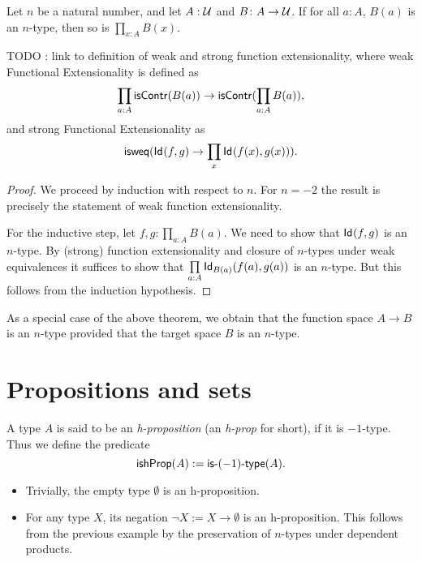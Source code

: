 \begin{thm}\label{thm:hlevel-prod}
 Let $n$ be a natural number, and let $A : \type$ and $B \colon A \to \type$.
     If for all $a : A$, $B(a)$ is an $n$-type, then so is $\prod\limits_{x : A} B(x)$.
\end{thm}

TODO : link to definition of weak and strong function extensionality, where
weak Functional Extensionality is defined as
\[ \prod_{a : A} \iscontr (B(a)) \to \iscontr (\prod_{a : A} B(a)), \]
and strong Functional Extensionality as
\[ \isweq (\idtype{f}{g} \to \prod_x \idtype{f(x)}{g(x)}). \]

\begin{proof}
 We proceed by induction with respect to $n$. For $n = -2$ the result is precisely the statement of weak function extensionality.

 For the inductive step, let $f, g : \prod\limits_{a:A}B(a)$. We need to show that
      $\idtype{f}{g}$ is an $n$-type. By (strong) function extensionality and closure of $n$-types
      under weak equivalences it suffices to show that
      $\prod\limits_{a : A} \idtype[B(a)]{f(a)}{g(a)}$ is an $n$-type. But this follows from the
      induction hypothesis.
\end{proof}

\noindent
As a special case of the above theorem, we obtain that the function space $A \to B$ is an $n$-type
provided that the target space $B$ is an $n$-type.

\section{Propositions and sets}

\begin{defn}\label{defn:h-prop}
 A type $A$ is said to be an \emph{h-proposition} (an \emph{h-prop} for short), if it is $-1$-type.
  Thus we define the predicate
 \[\ishProp (A) := \istype{(-1)}(A)  .\]
\end{defn}

\begin{egs}
 \begin{itemize}
  \item Trivially, the empty type $\emptyset$ is an h-proposition.
  \item For any type $X$, its negation $\neg X := X \to \emptyset$ is an h-proposition. This follows from the previous example by the preservation of $n$-types under dependent products.
 \end{itemize}
\end{egs}

